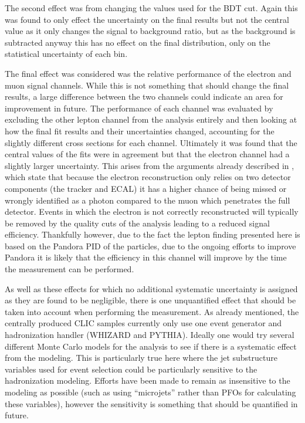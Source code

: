 The second effect was from changing the values used for the \ac{BDT} cut. Again this was found to only effect the uncertainty on the final results but not the central value as it only changes the signal to background ratio, but as the background is subtracted anyway this has no effect on the final distribution, only on the statistical uncertainty of each bin.

The final effect was considered was the relative performance of the electron and muon signal channels. While this is not something that should change the final results, a large difference between the two channels could indicate an area for improvement in future. The performance of each channel was evaluated by excluding the other lepton channel from the analysis entirely and then looking at how the final fit results and their uncertainties changed, accounting for the slightly different cross sections for each channel. Ultimately it was found that the central values of the fits were in agreement but that the electron channel had a slightly larger uncertainty. This arises from the arguments already described in , which state that because the electron reconstruction only relies on two detector components (the tracker and \ac{ECAL}) it has a higher chance of being missed or wrongly identified as a photon compared to the muon which penetrates the full detector. Events in which the electron is not correctly reconstructed will typically be removed by the quality cuts of the analysis leading to a reduced signal efficiency. Thankfully however, due to the fact the lepton finding presented here is based on the Pandora \ac{PID} of the particles, due to the ongoing efforts to improve Pandora it is likely that the efficiency in this channel will improve by the time the measurement can be performed. 

As well as these effects for which no additional systematic uncertainty is assigned as they are found to be negligible, there is one unquantified effect that should be taken into account when performing the measurement. As already mentioned, the centrally produced \ac{CLIC} samples currently only use one event generator and hadronization handler (WHIZARD and PYTHIA). Ideally one would try several different Monte Carlo models for the analysis to see if there is a systematic effect from the modeling. This is particularly true here where the jet substructure variables used for event selection could be particularly sensitive to the hadronization modeling. Efforts have been made to remain as insensitive to the modeling as possible (such as using ``microjets'' rather than PFOs for calculating these variables), however the sensitivity is something that should be quantified in future.

